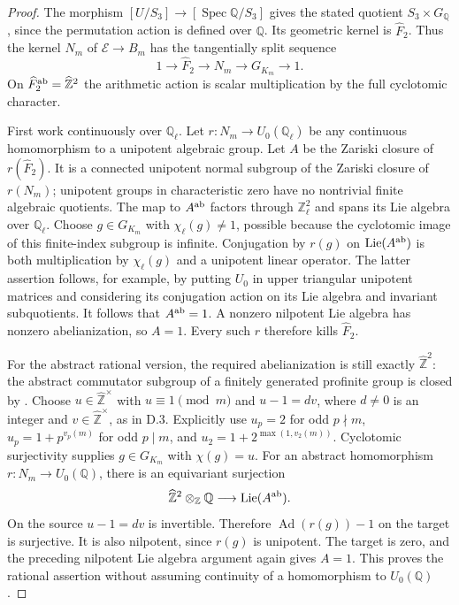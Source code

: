 \begin{proof}
The morphism $[U/S_3]\to[\operatorname{Spec}\mathbb Q/S_3]$
gives the stated quotient $S_3\times G_{\mathbb Q}$, since the
permutation action is defined over $\mathbb Q$. Its geometric
kernel is $\widehat F_2$. Thus the kernel $N_m$ of
$\mathcal E\to B_m$ has the tangentially split sequence
\[
 1\longrightarrow\widehat F_2\longrightarrow N_m
 \longrightarrow G_{K_m}\longrightarrow1.
\]
On $\widehat F_2^{\rm ab}=\widehat{\mathbb Z}^2$ the arithmetic
action is scalar multiplication by the full cyclotomic character.

First work continuously over $\mathbb Q_\ell$.
Let $r:N_m\to U_0(\mathbb Q_\ell)$ be any continuous homomorphism
to a unipotent algebraic group. Let $A$ be the Zariski closure of
$r(\widehat F_2)$. It is a connected unipotent normal subgroup
of the Zariski closure of $r(N_m)$; unipotent groups in characteristic
zero have no nontrivial finite algebraic quotients.
The map to $A^{\rm ab}$ factors through
$\mathbb Z_\ell^2$ and spans its Lie algebra over $\mathbb Q_\ell$.
Choose $g\in G_{K_m}$ with $\chi_\ell(g)\ne1$, possible because
the cyclotomic image of this finite-index subgroup is infinite.
Conjugation by $r(g)$ on $\operatorname{Lie}(A^{\rm ab})$
is both multiplication by $\chi_\ell(g)$ and a unipotent linear
operator. The latter assertion follows, for example, by putting
$U_0$ in upper triangular unipotent matrices and considering its
conjugation action on its Lie algebra and invariant subquotients.
It follows that $A^{\rm ab}=1$. A nonzero nilpotent Lie algebra
has nonzero abelianization, so $A=1$. Every such $r$ therefore
kills $\widehat F_2$.

For the abstract rational version, the required abelianization
is still exactly $\widehat{\mathbb Z}^2$: the abstract commutator
subgroup of a finitely generated profinite group is closed by
\cite[Theorem 1.4]{dNikolovSegal2007}.
Choose $u\in\widehat{\mathbb Z}^{\times}$ with $u\equiv1\pmod m$
and $u-1=dv$, where $d\ne0$ is an integer and
$v\in\widehat{\mathbb Z}^{\times}$, as in D.3.
Explicitly use $u_p=2$ for odd $p\nmid m$,
$u_p=1+p^{v_p(m)}$ for odd $p\mid m$, and
$u_2=1+2^{\max(1,v_2(m))}$.
Cyclotomic surjectivity supplies $g\in G_{K_m}$ with $\chi(g)=u$.
For an abstract homomorphism $r:N_m\to U_0(\mathbb Q)$, there is
an equivariant surjection
\[
 \widehat{\mathbb Z}^2\otimes_{\mathbb Z}\mathbb Q
 \longrightarrow\operatorname{Lie}(A^{\rm ab}).
\]
On the source $u-1=dv$ is invertible. Therefore
$\operatorname{Ad}(r(g))-1$ on the target is surjective. It is
also nilpotent, since $r(g)$ is unipotent. The target is zero,
and the preceding nilpotent Lie algebra argument again gives $A=1$.
This proves the rational assertion without assuming continuity
of a homomorphism to $U_0(\mathbb Q)$.


\end{proof}
